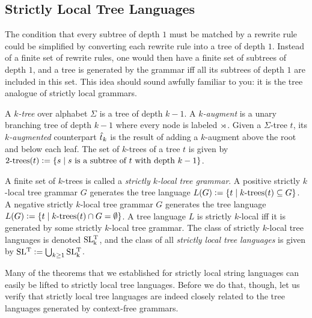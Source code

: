 \subsection{Strictly Local Tree Languages}

The condition that every subtree of depth $1$ must be matched by a rewrite rule could be simplified by converting each rewrite rule into a tree of depth $1$.
Instead of a finite set of rewrite rules, one would then have a finite set of subtrees of depth $1$, and a tree is generated by the grammar iff all its subtrees of depth $1$ are included in this set.
This idea should sound awfully familiar to you: it is the tree analogue of strictly local grammars.
%
\begin{definition}[$k$-trees]
    A \emph{$k$-tree} over alphabet $\Sigma$ is a tree of depth $k-1$.
    A \emph{$k$-augment} is a unary branching tree of depth $k-1$ where every node is labeled $\LeftEdge$.
    Given a $\Sigma$-tree $t$, its \emph{$k$-augmented} counterpart $\augmented{t}_k$ is the result of adding a $k$-augment above the root and below each leaf.
    The set of $k$-trees of a tree $t$ is given by $\ktrees(t) \is \setof{ s \mid s \text{ is a subtree of } t \text{ with depth } k-1}$.
\end{definition}
%
\begin{definition}
    A finite set of $k$-trees is called a \emph{strictly $k$-local tree grammar}.
    A positive strictly $k$-local tree grammar $G$ generates the tree language $L(G) \is \setof{ t \mid \ktrees[k](t) \subseteq G}$.
    A negative strictly $k$-local tree grammar $G$ generates the tree language $L(G) \is \setof{ t \mid \ktrees[k](t) \cap G = \emptyset}$.
    A tree language $L$ is strictly $k$-local iff it is generated by some strictly $k$-local tree grammar.
    The class of strictly $k$-local tree languages is denoted $\SLT[k]$, and the class of all \emph{strictly local tree languages} is given by $\SLT \is \bigcup_{k \geq 1} \SLT[k]$.
\end{definition}
%
Many of the theorems that we established for strictly local string languages can easily be lifted to strictly local tree languages.
Before we do that, though, let us verify that strictly local tree languages are indeed closely related to the tree languages generated by context-free grammars.

